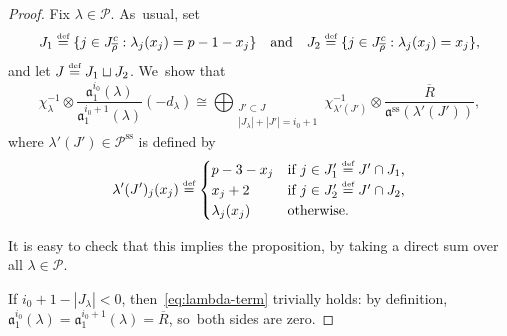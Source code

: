 \documentclass[JEP,XML,SOM,Unicode,NoFloatCountersInSection, NoEqCountersInSection,published]{cedram}
\newcommand{\quand}{\quad\text{and}\quad}
\let\ovl\overline
\newcommand{\defeq}{\stackrel{\textrm{\tiny{\upshape{def}}}}{=}}
\renewcommand{\P}{\mathscr P}
\renewcommand{\ss}{\mathrm{ss}}
\newcommand{\fa}{\mathfrak{a}}
\newcommand{\rhobar}{\overline{\rho}}
\theoremstyle{plain}
\theoremstyle{definition}
\begin{document}
\begin{proof}
Fix $\lambda\in\P$. As~usual, set
\[
J_1 \defeq \{ j \in J_{\rhobar}^c: \lambda_j(x_j) = p-1-x_j \}\quand J_2 \defeq \{ j \in J_{\rhobar}^c: \lambda_j(x_j) = x_j \},
\]
and let $J \defeq J_1 \sqcup J_2$. We~show that
\begin{equation}\label{eq:lambda-term}
\chi_{\lambda}^{-1}\otimes \frac{\fa_1^{i_0}(\lambda)}{\fa_1^{i_0+1}(\lambda)}(-d_\lambda) \cong \bigoplus_{\substack{J' \subset J\\ |J_\lambda|+|J'|=i_0+1}}\chi_{\lambda'(J')}^{-1}\otimes \frac{\ovl R}{\fa^\ss(\lambda'(J'))},
\end{equation}
where $\lambda'(J') \in \P^\ss$ is defined by
\begin{equation*}
\lambda'(J')_j(x_j) \defeq
\begin{cases}
p-3-x_j & \text{if $j \in J_1' \defeq J' \cap J_1$,} \\
x_j+2 & \text{if $j \in J_2' \defeq J' \cap J_2$,} \\
\lambda_j(x_j) & \text{otherwise.}
\end{cases}
\end{equation*}

It is easy to check that this implies the proposition, by taking a direct sum over all $\lambda \in \P$.

If $i_0+1-|J_\lambda| < 0$, then~\eqref{eq:lambda-term} trivially holds: by definition, $\fa_1^{i_0}(\lambda) = \fa_1^{i_0+1}(\lambda) = \ovl R$, so~both sides are zero.


\end{proof}
\end{document}

